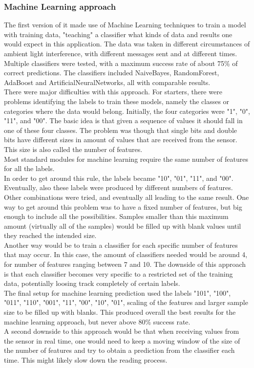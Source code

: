 \subsubsection{Machine Learning approach}
The first version of it made use of Machine Learning techniques to train a model with training data, "teaching" a classifier what kinds of data and results one would expect in this application. The data was taken in different circumstances of ambient light interference, with different messages sent and at different times.
Multiple classifiers were tested, with a maximum success rate of about 75\% of correct predictions. The classifiers included NaiveBayes, RandomForest, AdaBoost and ArtificialNeuralNetworks, all with comparable results.\\
There were major difficulties with this approach. For starters, there were problems identifying the labels to train these models, namely the classes or categories where the data would belong.
Initially, the four categories were "1", "0", "11", and "00". The basic idea is that given a sequence of values it should fall in one of these four classes.
The problem was though that single bits and double bits have different sizes in amount of values that are received from the sensor. This size is also called the number of features.\\
Most standard modules for machine learning require the same number of features for all the labels.\\
In order to get around this rule, the labels became "10", "01", "11", and "00". Eventually, also these labels were produced by different numbers of features. Other combinations were tried, and eventually all leading to the same result. 
One way to get around this problem was to have a fixed number of features, but big enough to include all the possibilities. Samples smaller than this maximum amount (virtually all of the samples) would be filled up with blank values until they reached the intended size.\\
Another way would be to train a classifier for each specific number of features that may occur. In this case, the amount of classifiers needed would be around 4, for number of features ranging between 7 and 10.
The downside of this approach is that each classifier becomes very specific to a restricted set of the training data, potentially loosing track completely of certain labels.\\
The final setup for machine learning prediction used the labels "101", "100", "011", "110", "001", "11", "00", "10", "01", scaling of the features and larger sample size to be filled up with blanks. This produced overall the best results for the machine learning approach, but never above 80\% success rate.\\
A second downside to this approach would be that when receiving values from the sensor in real time, one would need to keep a moving window  of the size of the number of features and try to obtain a prediction from the classifier each time.
This might likely slow down the reading process.\\

